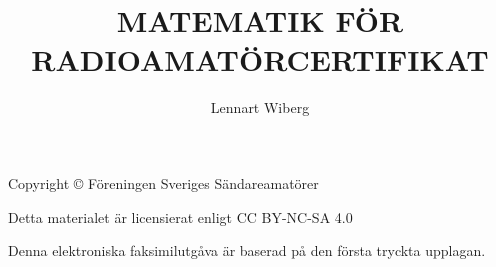 



\frontmatter
\title{MATEMATIK FÖR RADIOAMATÖRCERTIFIKAT}
\author{Lennart Wiberg}
\maketitle

Copyright © Föreningen Sveriges Sändareamatörer

Detta materialet är licensierat enligt CC BY-NC-SA 4.0

Denna elektroniska faksimilutgåva är baserad på den första tryckta
upplagan.





